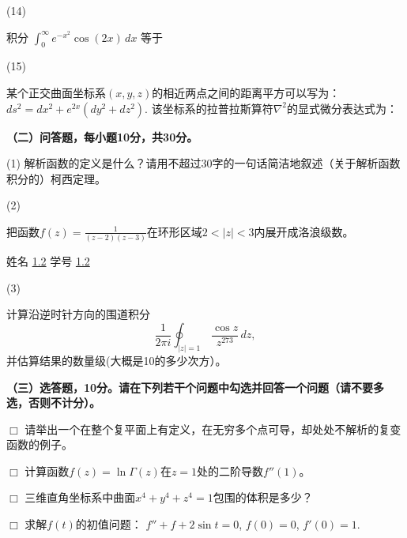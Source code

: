 \documentclass[CJK]{article}
\begin{document}
\item[(14)]{积分 $\int_0^\infty e^{-x^2}\cos{(2x)}\,dx$ 等于

}
\item[(15)]{某个正交曲面坐标系$(x,y,z)$的相近两点之间的距离平方可以写为：$ ds^2 = dx^2 + e^{2x}\left(dy^2 + dz^2\right).$
  该坐标系的拉普拉斯算符$\nabla^2$的显式微分表达式为：

}
  
  
\eitem

\newpage
{\bf \noindent （二）问答题，每小题10分，共30分。}

\bitem
\item[(1)]{解析函数的定义是什么？请用不超过30字的一句话简洁地叙述（关于解析函数积分的）柯西定理。
{\vskip 2.5in}
  }
\item[(2)]{把函数$f(z) = \frac{1}{(z-2)(z-3)}$在环形区域$2<|z|<3$内展开成洛浪级数。
\newpage
\bcenter

姓名 \uline{1.2} {\hskip 0.5in}    学号 \uline{1.2}{\hskip 0.5in}

\ecenter

{\vskip 0.1in}
}
\item[(3)]{

  计算沿逆时针方向的围道积分
  $$\frac{1}{2\pi i}\oint_{|z|=1} \,\frac{\cos z}{z^{273}}\,dz,$$
  并估算结果的数量级(大概是10的多少次方）。
}  
\eitem

\newpage
{\bf \noindent（三）选答题，10分。请在下列若干个问题中勾选并回答一个问题（请不要多选，否则不计分）。}

\bitem
\item[{\bf $\Box$}]{请举出一个在整个复平面上有定义，在无穷多个点可导，却处处不解析的复变函数的例子。}
\item[{\bf $\Box$}]{计算函数$f(z) = \ln \Gamma(z)$在$z=1$处的二阶导数$f''(1)$。}
\item[{\bf $\Box$}]{三维直角坐标系中曲面$x^4+y^4+z^4=1$包围的体积是多少？}
\item[{\bf $\Box$}]{求解$f(t)$的初值问题： $f'' + f + 2\sin t = 0$, $f(0)= 0$,  $f'(0) = 1$.}
  \eitem
\end{document}
